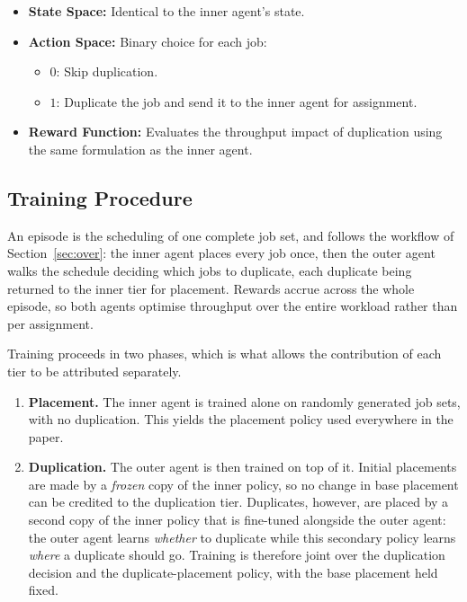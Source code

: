 \documentclass{article}
\begin{document}
\begin{itemize}
    \item \textbf{State Space:} Identical to the inner agent’s state.
    \item \textbf{Action Space:} Binary choice for each job:
    \begin{itemize}
        \item $0$: Skip duplication.
        \item $1$: Duplicate the job and send it to the inner agent for assignment.
    \end{itemize}
    \item \textbf{Reward Function:} Evaluates the throughput impact of duplication using the same formulation as the inner agent.
\end{itemize}

\subsection{Training Procedure}

An episode is the scheduling of one complete job set, and follows the workflow of
Section~\ref{sec:over}: the inner agent places every job once, then the outer agent
walks the schedule deciding which jobs to duplicate, each duplicate being returned
to the inner tier for placement. Rewards accrue across the whole episode, so both
agents optimise throughput over the entire workload rather than per assignment.

Training proceeds in two phases, which is what allows the contribution of each
tier to be attributed separately.

\begin{enumerate}\itemsep2pt
\item \textbf{Placement.} The inner agent is trained alone on randomly generated
  job sets, with no duplication. This yields the placement policy used everywhere
  in the paper.
\item \textbf{Duplication.} The outer agent is then trained on top of it. Initial
  placements are made by a \emph{frozen} copy of the inner policy, so no change in
  base placement can be credited to the duplication tier. Duplicates, however, are
  placed by a second copy of the inner policy that is fine-tuned alongside the
  outer agent: the outer agent learns \emph{whether} to duplicate while this
  secondary policy learns \emph{where} a duplicate should go. Training is therefore
  joint over the duplication decision and the duplicate-placement policy, with the
  base placement held fixed.
\end{enumerate}
\end{document}
